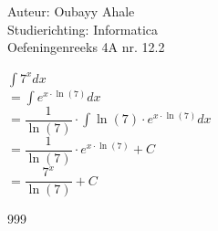 \documentclass[a4paper]{article}
\newcommand{\dint}{\displaystyle\int}
\begin{document}
  
\noindent \large Auteur: Oubayy Ahale          \\
\noindent \large Studierichting: Informatica   \\
\noindent \large Oefeningenreeks 4A nr. 12.2   \\

\medskip

\normalsize

$\dint 7^x dx $\\

$= \dint e^{x \cdot \ln(7)} dx $\\

$= \dfrac{1}{\ln(7)} \cdot \dint \ln(7) \cdot e^{x \cdot \ln(7)} dx $\\

$= \dfrac{1}{\ln(7)} \cdot e^{x \cdot \ln(7)} + C $\\

$= \dfrac{7^x}{\ln(7)} + C $\\

\begin{thebibliography}{999}
\end{thebibliography}
\end{document}
